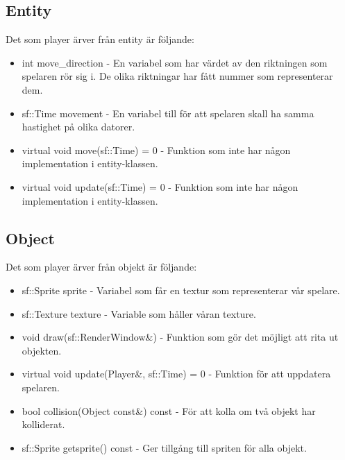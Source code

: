 \documentclass{TDP005mall}
\begin{document}
\subsection{Entity}

Det som player ärver från entity är följande:

\begin{itemize}
  \item int move\_direction - En variabel som har värdet av den riktningen som
    spelaren rör sig i. De olika riktningar har fått nummer som representerar
    dem.
    
  \item sf::Time movement - En variabel till för att spelaren skall ha samma
    hastighet på olika datorer.
    
  \item virtual void move(sf::Time) = 0 - Funktion som inte har någon
    implementation i entity-klassen.
    
  \item virtual void update(sf::Time) = 0 - Funktion som inte har någon
    implementation i entity-klassen.
    
\end{itemize}

\subsection{Object}
Det som player ärver från objekt är följande:

\begin{itemize}
  \item  sf::Sprite sprite - Variabel som får en textur som representerar vår spelare.

  \item sf::Texture texture - Variable som håller våran texture.
    
  \item void draw(sf::RenderWindow\&) - Funktion som gör det möjligt att rita ut
    objekten.

  \item virtual void update(Player\&, sf::Time) = 0 - Funktion för att uppdatera spelaren.
    
  \item bool collision(Object const\&) const  - För att kolla om två objekt har
    kolliderat.

  \item sf::Sprite getsprite() const - Ger tillgång till spriten för alla objekt.
    
\end{itemize}
\end{document}
